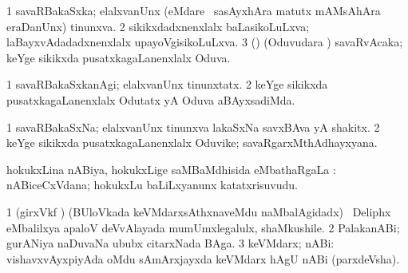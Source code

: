 \bentry
{}
\gl{\gu}
\bmng
\bnum
\num{1} savaRBakaSxka; elalxvanUnx (eMdare \kanmu\ sasAyxhAra matutx mAMsAhAra eraDanUnx) tinunxva. 
\num{2} sikikxdadxnenxlalx baLasikoLuLxva; laBayxvAdadadxnenxlalx upayoVgisikoLuLxva. 
\num{3} (\rUpa) (Oduvudara \vi) savaRvAcaka; keYge sikikxda pusatxkagaLanenxlalx Oduva. 
\enum
\emng
\eentry

\bentry
{}
\gl{\kirxvi}
\bmng
\bnum
\num{1} savaRBakaSxkanAgi; elalxvanUnx tinunxtatx. 
\num{2} keYge sikikxda pusatxkagaLanenxlalx Odutatx yA Oduva aBAyxsadiMda. 
\enum
\emng
\eentry

\bentry
{}
\gl{\nA}
\bmng
\bnum
\num{1} savaRBakaSxNa; elalxvanUnx tinunxva lakaSxNa savxBAva yA shakitx. 
\num{2} keYge sikikxda pusatxkagaLanenxlalx Oduvike; savaRgarxMthAdhayxyana. 
\enum
\emng
\eentry

\bentry
{}
\gl{\sapUpa}
\bmng
hokukxLina nABiya, hokukxLige saMBaMdhisida eMbathaRgaLa \sapUpa:  nABiceCxVdana; hokukxLu baLiLxyanunx katatxrisuvudu. 
\emng
\eentry

\bentry
{}
\gl{\nA}
\bmng
\bnum
\num{1} (girxVkf \pArxca) (BUloVkada keVMdarxsAthxnaveMdu naMbalAgidadx) \kanmu\ Deliphx eMbalilxya apaloV deVvAlayada mumUmxlegalulx, shaMkushile. 
\num{2} PalakanABi; gurANiya naDuvaNa ububx citarxNada BAga. 
\num{3} keVMdarx; nABi:  vishavxvAyxpiyAda oMdu sAmArxjayxda keVMdarx hAgU nABi (parxdeVsha). 
\enum
\emng
\eentry

